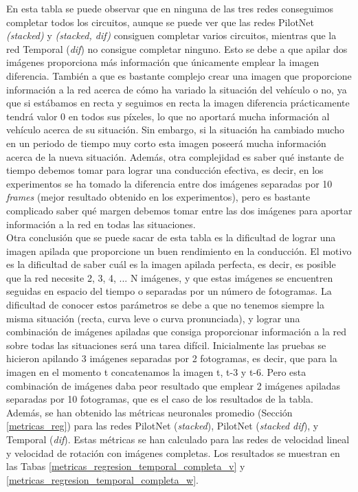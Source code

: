 En esta tabla se puede observar que en ninguna de las tres redes conseguimos completar todos los circuitos, aunque se puede ver que las redes PilotNet \textit{(stacked)} y \textit{(stacked, dif)} consiguen completar varios circuitos, mientras que la red Temporal (\textit{dif}) no consigue completar ninguno. Esto se debe a que apilar dos imágenes proporciona más información que únicamente emplear la imagen diferencia. También a que es bastante complejo crear una imagen que proporcione información a la red acerca de cómo ha variado la situación del vehículo o no, ya que si estábamos en recta y seguimos en recta la imagen diferencia prácticamente tendrá valor 0 en todos sus píxeles, lo que no aportará mucha información al vehículo acerca de su situación. Sin embargo, si la situación ha cambiado mucho en un periodo de tiempo muy corto esta imagen poseerá mucha información acerca de la nueva situación. Además, otra complejidad es saber qué instante de tiempo debemos tomar para lograr una conducción efectiva, es decir, en los experimentos se ha tomado la diferencia entre dos imágenes separadas por 10 \textit{frames} (mejor resultado obtenido en los experimentos), pero es bastante complicado saber qué margen debemos tomar entre las dos imágenes para aportar información a la red en todas las situaciones.\\


Otra conclusión que se puede sacar de esta tabla es la dificultad de lograr una imagen apilada que proporcione un buen rendimiento en la conducción. El motivo es la dificultad de saber cuál es la imagen apilada perfecta, es decir, es posible que la red necesite 2, 3, 4, ... N imágenes, y que estas imágenes se encuentren seguidas en espacio del tiempo o separadas por un número de fotogramas. La dificultad de conocer estos parámetros se debe a que no tenemos siempre la misma situación (recta, curva leve o curva pronunciada), y lograr una combinación de imágenes apiladas que consiga proporcionar información a la red sobre todas las situaciones será una tarea difícil. Inicialmente las pruebas se hicieron apilando 3 imágenes separadas por 2 fotogramas, es decir, que para la imagen en el momento t concatenamos la imagen t, t-3 y t-6. Pero esta combinación de imágenes daba peor resultado que emplear 2 imágenes apiladas separadas por 10 fotogramas, que es el caso de los resultados de la tabla.\\


Además, se han obtenido las métricas neuronales promedio (Sección \ref{metricas_reg}) para las redes PilotNet (\textit{stacked}), PilotNet (\textit{stacked dif}), y Temporal (\textit{dif}). Estas métricas se han calculado para las redes de velocidad lineal y velocidad de rotación con imágenes completas. Los resultados se muestran en las Tabas \ref{metricas_regresion_temporal_completa_v} y \ref{metricas_regresion_temporal_completa_w}.\\


